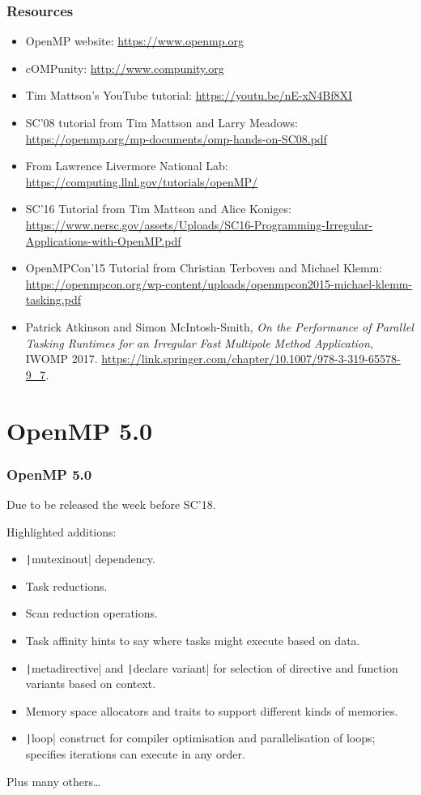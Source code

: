 \documentclass{beamer}
\begin{document}
\begin{frame}
\frametitle{Resources}
\begin{itemize}
  \item OpenMP website: \url{https://www.openmp.org}
  \item cOMPunity: \url{http://www.compunity.org}
  \item Tim Mattson's YouTube tutorial: \url{https://youtu.be/nE-xN4Bf8XI}
  \item SC'08 tutorial from Tim Mattson and Larry Meadows: \url{https://openmp.org/mp-documents/omp-hands-on-SC08.pdf}
  \item From Lawrence Livermore National Lab: \url{https://computing.llnl.gov/tutorials/openMP/}
  \item SC'16 Tutorial from Tim Mattson and Alice Koniges: \url{https://www.nersc.gov/assets/Uploads/SC16-Programming-Irregular-Applications-with-OpenMP.pdf}
  \item OpenMPCon'15 Tutorial from Christian Terboven and Michael Klemm: \url{https://openmpcon.org/wp-content/uploads/openmpcon2015-michael-klemm-tasking.pdf}
  \item Patrick Atkinson and Simon McIntosh-Smith, \emph{On the Performance of Parallel Tasking Runtimes for an Irregular Fast Multipole Method Application}, IWOMP 2017. \url{https://link.springer.com/chapter/10.1007/978-3-319-65578-9_7}.
\end{itemize}
\end{frame}

\section{OpenMP 5.0}
\begin{frame}
\frametitle{OpenMP 5.0}

Due to be released the week before SC'18.

Highlighted additions:
\begin{itemize}
  \item \texttt|mutexinout| dependency.
  \item Task reductions.
  \item Scan reduction operations.
  \item Task affinity hints to say where tasks might execute based on data.
  \item \texttt|metadirective| and \texttt|declare variant| for selection of directive and function variants based on context.
  \item Memory space allocators and traits to support different kinds of memories.
  \item \texttt|loop| construct for compiler optimisation and parallelisation of loops; specifies iterations can execute in any order.
\end{itemize}

Plus many others\dots

\end{frame}
\end{document}
